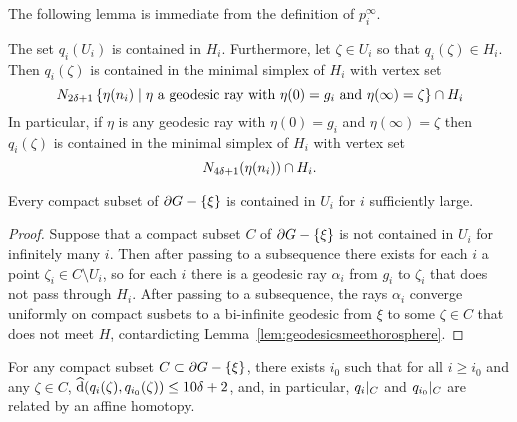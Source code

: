 \documentclass[a4paper]{article}
\begin{document}
The following lemma is immediate from the definition of $p^\infty_i$.

\begin{lemma}\label{lem:describing_q_i}
  The set $q_i(U_i)$ is contained in $H_i$.
  Furthermore, let $\zeta \in U_i$ so that $q_i(\zeta) \in H_i$.  Then
  $q_i(\zeta)$ is contained in the minimal simplex of $H_i$ with vertex set
  \begin{equation*}
    N_{2\delta+1} \left\{\eta(n_i)\mid\text{$\eta$ a geodesic ray with
    $\eta(0) = g_i$ and $\eta(\infty) = \zeta$}\right\} \cap H_i
  \end{equation*}
  In particular, if $\eta$ is any geodesic ray with $\eta(0) = g_i$ and
  $\eta(\infty) = \zeta$ then $q_i(\zeta)$ is contained in the minimal simplex
  of $H_i$ with vertex set
  \begin{equation*}
    N_{4\delta + 1}(\eta(n_i)) \cap H_i.
  \end{equation*}
\end{lemma}

\begin{lemma}
  Every compact subset of $\partial G - \left\{\xi\right\}$ is contained in $U_i$ for 
  $i$ sufficiently large.
\end{lemma} 

\begin{proof}
  Suppose that a compact subset $C$ of $\partial G - \left\{\xi\right\}$ is not contained
  in $U_i$ for infinitely many $i$. Then after passing to a subsequence there
  exists for each $i$ a point $\zeta_i \in C\setminus U_i$, so for each $i$
  there is a geodesic ray $\alpha_i$ from $g_i$ to $\zeta_i$ that does not pass
  through $H_i$. After passing to a subsequence, the rays $\alpha_i$ converge uniformly on compact susbets to a bi-infinite geodesic from $\xi$ to some $\zeta \in C$ that does not meet $H$, contardicting Lemma~\ref{lem:geodesicsmeethorosphere}.
\end{proof}

\begin{lemma}\label{lem:affinehomotopic}
  For any compact subset $C\subset\partial G - \left\{\xi\right\}$, there exists $i_0$ 
  such that for all $i \geq i_0$ and any $\zeta \in C$, $\operatorname{\widehat{d}}(q_i(\zeta),
  q_{i_0}(\zeta)) \leq 10\delta + 2$, and, in particular, $q_i\vert_{C}$
  and $q_{i_0}\vert_{C}$ are related by an affine homotopy.
\end{lemma}
\end{document}
